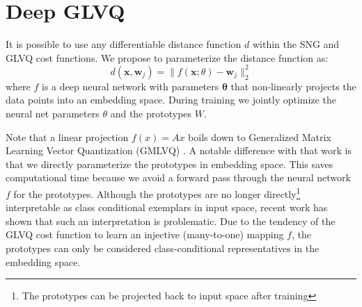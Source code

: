 \documentclass{esannV2}
\begin{document}

\section{Deep GLVQ}
It is possible to use any differentiable distance function $d$ within the SNG and GLVQ cost functions. We propose to parameterize the distance function as:
\begin{equation}
 d(\mathbf{x}, \mathbf{w}_j) = \|f(\mathbf{x}; \theta) - \mathbf{w}_j\|^2_2
\end{equation}
where $f$ is a deep neural network with parameters $\mathbf{\theta}$ that non-linearly projects the data points into an embedding space. During training we jointly optimize the neural net parameters $\theta$ and the prototypes $W$. 

Note that a linear projection $f(x) = Ax$ boils down to Generalized Matrix Learning Vector Quantization (GMLVQ) \cite{schneider2009adaptive,bunte2012limited}. A notable difference with that work is that we directly parameterize the prototypes in embedding space. This saves computational time because we avoid a forward pass through the neural network $f$ for the prototypes. Although the prototypes are no longer directly\footnote{The prototypes can be projected back to input space after training} interpretable as class conditional exemplars in input space, recent work\cite{de2013stationarity} has shown that such an interpretation is problematic. Due to the tendency of the GLVQ cost function to learn an injective (many-to-one) mapping $f$, the prototypes can only be considered class-conditional representatives in the embedding space. 
\end{document}
